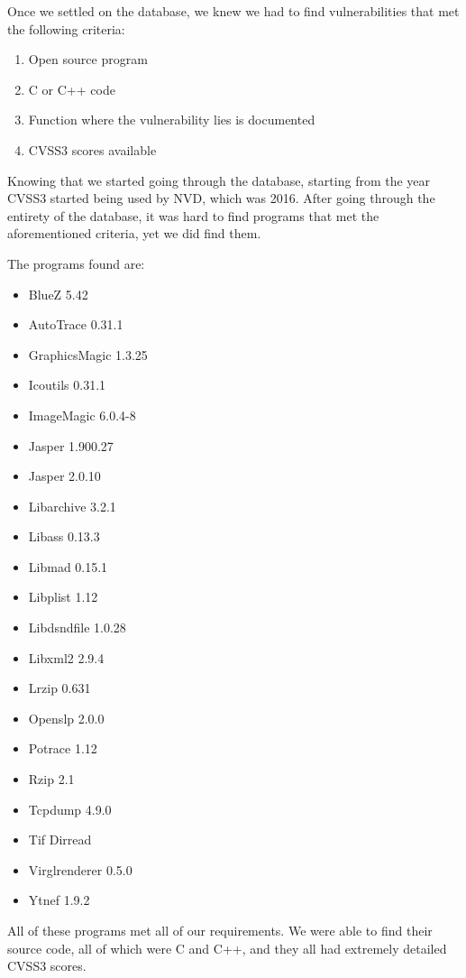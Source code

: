 Once we settled on the database, we knew we had to find vulnerabilities that met the following criteria:

\begin{enumerate}
	\item Open source program
	\item C or C++ code
	\item Function where the vulnerability lies is documented
	\item CVSS3 scores available
\end{enumerate}

Knowing that we started going through the database, starting from the year CVSS3 started being used by NVD, which was 2016. After going through the entirety of the database, it was hard to find programs that met the aforementioned criteria, yet we did find them.

The programs found are:

\begin{itemize}
	\item BlueZ 5.42
	\item AutoTrace 0.31.1
	\item GraphicsMagic 1.3.25
	\item Icoutils 0.31.1
	\item ImageMagic 6.0.4-8
	\item Jasper 1.900.27
	\item Jasper 2.0.10
	\item Libarchive 3.2.1
	\item Libass 0.13.3
	\item Libmad 0.15.1
	\item Libplist 1.12
	\item Libdsndfile 1.0.28
	\item Libxml2 2.9.4
	\item Lrzip 0.631
	\item Openslp 2.0.0
	\item Potrace 1.12
	\item Rzip 2.1
	\item Tcpdump 4.9.0
	\item Tif Dirread
	\item Virglrenderer 0.5.0
	\item Ytnef 1.9.2
\end{itemize}

All of these programs met all of our requirements. We were able to find their source code, all of which were C and C++, and they all had extremely detailed CVSS3 scores.

